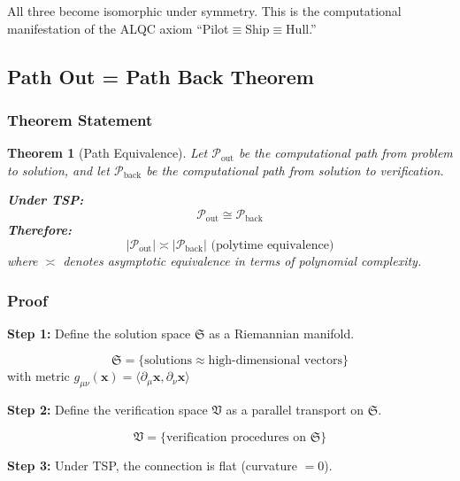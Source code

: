 \documentclass[11pt, letterpaper]{article}
\newtheorem{theorem}{Theorem}[section]
\begin{document}
All three become isomorphic under symmetry. This is the computational manifestation of the ALQC axiom ``Pilot$\equiv$Ship$\equiv$Hull.''

\subsection{Path Out = Path Back Theorem}

\subsubsection{Theorem Statement}

\begin{theorem}[Path Equivalence]
Let $\mathcal{P}_{\text{out}}$ be the computational path from problem to solution, and let $\mathcal{P}_{\text{back}}$ be the computational path from solution to verification.

\textbf{Under TSP:}
\begin{equation}
\mathcal{P}_{\text{out}} \cong \mathcal{P}_{\text{back}}
\end{equation}
\textbf{Therefore:}
\begin{equation}
|\mathcal{P}_{\text{out}}| \asymp |\mathcal{P}_{\text{back}}| \text{ (polytime equivalence)}
\end{equation}
where $\asymp$ denotes asymptotic equivalence in terms of polynomial complexity.
\end{theorem}

\subsubsection{Proof}

\textbf{Step 1:} Define the solution space $\mathfrak{S}$ as a Riemannian manifold.

\begin{equation}
\mathfrak{S} = \{ \text{solutions} \approx \text{high-dimensional vectors} \}
\end{equation}
with metric $g_{\mu\nu}(\mathbf{x}) = \langle \partial_\mu \mathbf{x}, \partial_\nu \mathbf{x} \rangle$

\textbf{Step 2:} Define the verification space $\mathfrak{V}$ as a parallel transport on $\mathfrak{S}$.

\begin{equation}
\mathfrak{V} = \{ \text{verification procedures} \text{ on } \mathfrak{S} \}
\end{equation}

\textbf{Step 3:} Under TSP, the connection is flat (curvature $= 0$).
\end{document}
